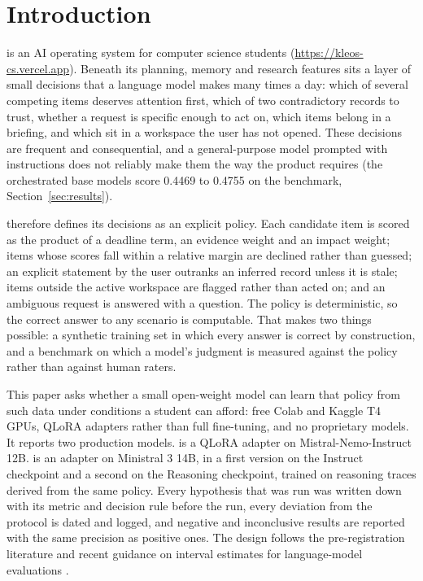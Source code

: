 \section{Introduction}

\kleos{} is an AI operating system for computer science students (\url{https://kleos-cs.vercel.app}). Beneath its planning, memory and research features sits a layer of small decisions that a language model makes many times a day: which of several competing items deserves attention first, which of two contradictory records to trust, whether a request is specific enough to act on, which items belong in a briefing, and which sit in a workspace the user has not opened. These decisions are frequent and consequential, and a general-purpose model prompted with instructions does not reliably make them the way the product requires (the orchestrated base models score 0.4469 to 0.4755 on the benchmark, Section~\ref{sec:results}).



\kleos{} therefore defines its decisions as an explicit policy. Each candidate item is scored as the product of a deadline term, an evidence weight and an impact weight; items whose scores fall within a relative margin are declined rather than guessed; an explicit statement by the user outranks an inferred record unless it is stale; items outside the active workspace are flagged rather than acted on; and an ambiguous request is answered with a question. The policy is deterministic, so the correct answer to any scenario is computable. That makes two things possible: a synthetic training set in which every answer is correct by construction, and a benchmark on which a model's judgment is measured against the policy rather than against human raters.

This paper asks whether a small open-weight model can learn that policy from such data under conditions a student can afford: free Colab and Kaggle T4 GPUs, QLoRA adapters rather than full fine-tuning, and no proprietary models. It reports two production models. \hermes{} is a QLoRA adapter on Mistral-Nemo-Instruct 12B. \logos{} is an adapter on Ministral 3 14B, in a first version on the Instruct checkpoint and a second on the Reasoning checkpoint, trained on reasoning traces derived from the same policy. Every hypothesis that was run was written down with its metric and decision rule before the run, every deviation from the protocol is dated and logged, and negative and inconclusive results are reported with the same precision as positive ones. The design follows the pre-registration literature \citep{nosek2018preregistration,vanmiltenburg2021preregistering,bertinetto2021preface} and recent guidance on interval estimates for language-model evaluations \citep{miller2024errorbars}.

